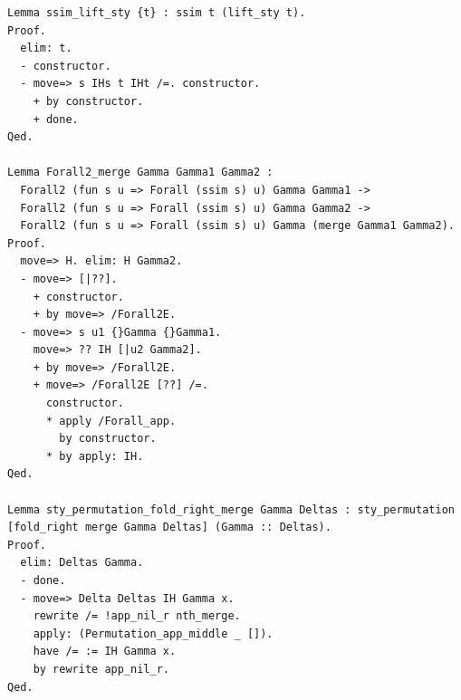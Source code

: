 \documentclass[10pt,a4paper]{article}
\begin{document}
\begin{lstlisting}[style=authorcoq]
Lemma ssim_lift_sty {t} : ssim t (lift_sty t).
Proof.
  elim: t.
  - constructor.
  - move=> s IHs t IHt /=. constructor.
    + by constructor.
    + done.
Qed.

Lemma Forall2_merge Gamma Gamma1 Gamma2 :
  Forall2 (fun s u => Forall (ssim s) u) Gamma Gamma1 ->
  Forall2 (fun s u => Forall (ssim s) u) Gamma Gamma2 ->
  Forall2 (fun s u => Forall (ssim s) u) Gamma (merge Gamma1 Gamma2).
Proof.
  move=> H. elim: H Gamma2.
  - move=> [|??].
    + constructor.
    + by move=> /Forall2E.
  - move=> s u1 {}Gamma {}Gamma1.
    move=> ?? IH [|u2 Gamma2].
    + by move=> /Forall2E.
    + move=> /Forall2E [??] /=.
      constructor.
      * apply /Forall_app.
        by constructor.
      * by apply: IH.
Qed.

Lemma sty_permutation_fold_right_merge Gamma Deltas : sty_permutation [fold_right merge Gamma Deltas] (Gamma :: Deltas).
Proof.
  elim: Deltas Gamma.
  - done.
  - move=> Delta Deltas IH Gamma x.
    rewrite /= !app_nil_r nth_merge.
    apply: (Permutation_app_middle _ []).
    have /= := IH Gamma x.
    by rewrite app_nil_r.
Qed.


\end{lstlisting}
\end{document}
